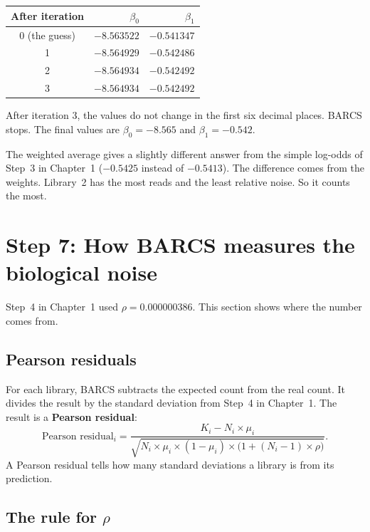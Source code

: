 \begin{center}
\begin{tabular}{crr}
\toprule
After iteration & $\beta_0$ & $\beta_1$\\
\midrule
0 (the guess) & $-8.563522$ & $-0.541347$\\
1 & $-8.564929$ & $-0.542486$\\
2 & $-8.564934$ & $-0.542492$\\
3 & $-8.564934$ & $-0.542492$\\
\bottomrule
\end{tabular}
\end{center}

After iteration 3, the values do not change in the first six decimal places.
BARCS stops. The final values are $\beta_0 = -8.565$ and
$\beta_1 = -0.542$.

\begin{remember}
The weighted average gives a slightly different answer from the simple
log-odds of Step~3 in Chapter~1 ($-0.5425$ instead of $-0.5413$). The difference comes
from the weights. Library~2 has the most reads and the least relative noise.
So it counts the most.
\end{remember}

\section{Step 7: How BARCS measures the biological noise}

Step~4 in Chapter~1 used $\rho = 0.000000386$. This section shows where the number comes
from.

\subsection{Pearson residuals}

For each library, BARCS subtracts the expected count from the real count.
It divides the result by the standard deviation from Step~4 in Chapter~1. The result is a
\textbf{Pearson residual}:
\[
\text{Pearson residual}_i =
\frac{K_i - N_i \times \mu_i}{\sqrt{N_i \times \mu_i \times (1-\mu_i) \times \bigl(1 + (N_i-1) \times \rho\bigr)}}.
\]
A Pearson residual tells how many standard deviations a library is from its
prediction.

\subsection{The rule for \texorpdfstring{$\rho$}{rho}}

